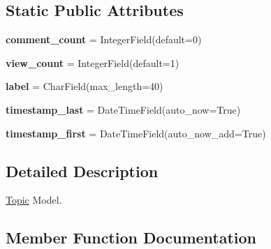 \subsection*{Static Public Attributes}
\begin{DoxyCompactItemize}
\item 
\hypertarget{class_meanco_app_1_1models_1_1topic_1_1_topic_aea39b71d344d289b47525d3198c09921}{}\label{class_meanco_app_1_1models_1_1topic_1_1_topic_aea39b71d344d289b47525d3198c09921} 
{\bfseries comment\+\_\+count} = Integer\+Field(default=0)
\item 
\hypertarget{class_meanco_app_1_1models_1_1topic_1_1_topic_a0a8a52b8b94a288c0baa17706743f9a4}{}\label{class_meanco_app_1_1models_1_1topic_1_1_topic_a0a8a52b8b94a288c0baa17706743f9a4} 
{\bfseries view\+\_\+count} = Integer\+Field(default=1)
\item 
\hypertarget{class_meanco_app_1_1models_1_1topic_1_1_topic_a96209ea78e5c4cee3cce27c518941647}{}\label{class_meanco_app_1_1models_1_1topic_1_1_topic_a96209ea78e5c4cee3cce27c518941647} 
{\bfseries label} = Char\+Field(max\+\_\+length=40)
\item 
\hypertarget{class_meanco_app_1_1models_1_1topic_1_1_topic_a4b9106978b399304163dad85384f9d97}{}\label{class_meanco_app_1_1models_1_1topic_1_1_topic_a4b9106978b399304163dad85384f9d97} 
{\bfseries timestamp\+\_\+last} = Date\+Time\+Field(auto\+\_\+now=True)
\item 
\hypertarget{class_meanco_app_1_1models_1_1topic_1_1_topic_a3e136e7e2278d349f6ed379dd93962e9}{}\label{class_meanco_app_1_1models_1_1topic_1_1_topic_a3e136e7e2278d349f6ed379dd93962e9} 
{\bfseries timestamp\+\_\+first} = Date\+Time\+Field(auto\+\_\+now\+\_\+add=True)
\end{DoxyCompactItemize}


\subsection{Detailed Description}
\hyperlink{class_meanco_app_1_1models_1_1topic_1_1_topic}{Topic} Model. 

\subsection{Member Function Documentation}
\hypertarget{class_meanco_app_1_1models_1_1topic_1_1_topic_a595fff7e09861a17981f9c0c7a5c9dfd}{}\label{class_meanco_app_1_1models_1_1topic_1_1_topic_a595fff7e09861a17981f9c0c7a5c9dfd} 
